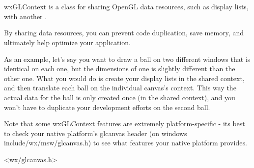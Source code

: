 \section{}\label{wxglcontext}

wxGLContext is a class for sharing OpenGL data resources, such as display lists, with another .

By sharing data resources, you can prevent code duplication, save memory, and ultimately help optimize your application.

As an example, let's say you want to draw a ball on two different windows that is identical on each one, but the dimensions of one is slightly different than the other one.  What you would do is create your display lists in the shared context, and then translate each ball on the individual canvas's context.  This way the actual data for the ball is only created once (in the shared context), and you won't have to duplicate your development efforts on the second ball.

Note that some wxGLContext features are extremely platform-specific - its best to check your native platform's glcanvas header (on windows include/wx/msw/glcanvas.h) to see what features your native platform provides.




<wx/glcanvas.h>




\label{wxglcontextconstr}





\label{wxglcontextgetwindow}

